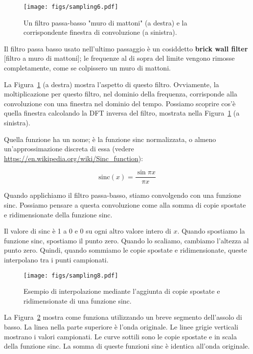 \documentclass[12pt,a4paper]{book}
\begin{document}
\begin{figure} 

\centerline{\texttt{[image: figs/sampling6.pdf]}} \caption{Un filtro passa-basso "muro di mattoni" (a destra) e la corrispondente finestra di convoluzione (a sinistra).} \label{fig.sampling6} \end{figure} 

Il filtro passa basso usato nell'ultimo passaggio è un cosiddetto {\bf brick wall filter} [filtro a muro di mattoni]; le frequenze al di sopra del limite vengono rimosse completamente, come se colpissero un muro di mattoni.

La Figura~\ref{fig.sampling6} (a destra) mostra l'aspetto di questo filtro. Ovviamente, la moltiplicazione per questo filtro, nel dominio della frequenza, corrisponde alla convoluzione con una finestra nel dominio del tempo. Possiamo scoprire cos'è quella finestra calcolando la DFT inversa del filtro, mostrata nella Figura~\ref{fig.sampling6} (a sinistra).

Quella funzione ha un nome; è la funzione sinc normalizzata, o almeno un'approssimazione discreta di essa (vedere \url{https://en.wikipedia.org/wiki/Sinc_function}):

\[ \mathrm{sinc}(x) = \frac{\sin \pi x}{\pi x} \] 

Quando applichiamo il filtro passa-basso, stiamo convolgendo con una funzione sinc. Possiamo pensare a questa convoluzione come alla somma di copie spostate e ridimensionate della funzione sinc.

Il valore di sinc è 1 a 0 e 0 su ogni altro valore intero di $x$. Quando spostiamo la funzione sinc, spostiamo il punto zero. Quando lo scaliamo, cambiamo l'altezza al punto zero. Quindi, quando sommiamo le copie spostate e ridimensionate, queste interpolano tra i punti campionati.

\begin{figure} 

\centerline{\texttt{[image: figs/sampling8.pdf]}} \caption{Esempio di interpolazione mediante l'aggiunta di copie spostate e ridimensionate di una funzione sinc.} \label{fig.sampling8} \end{figure} 

La Figura~\ref{fig.sampling8} mostra come funziona utilizzando un breve segmento dell'assolo di basso. La linea nella parte superiore è l'onda originale. Le linee grigie verticali mostrano i valori campionati. Le curve sottili sono le copie spostate e in scala della funzione sinc. La somma di queste funzioni sinc è identica all'onda originale.
\end{document}
